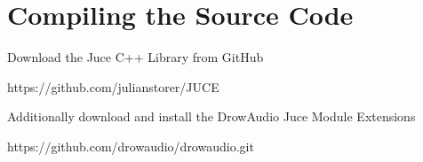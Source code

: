 \section{Compiling the Source Code}

Download the Juce C++ Library from GitHub

https://github.com/julianstorer/JUCE

Additionally download and install the DrowAudio Juce Module Extensions

https://github.com/drowaudio/drowaudio.git